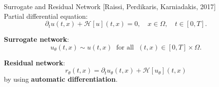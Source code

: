 \documentclass[9pt]{beamer}
\begin{document}
\begin{frame}{Surrogate and Residual Network}
    \vspace{-1\baselineskip}\hfill{\tiny{[Raissi, Perdikaris, Karniadakis, 2017]}} \\
    Partial differential equation: \\
    \begin{equation*}
        \partial_t u\left(t,x\right) + \mathcal{H} \left[ u \right] \left(t, x\right) = 0, \quad x \in \Omega, \quad t \in \left[ 0, T \right].
    \end{equation*}

    \vspace{3mm}

    \textbf{Surrogate network}: \\
    \begin{equation*}
        u_\theta \left(t, x \right) \sim u\left(t,x\right) \; \text{ for all } \; \left(t, x \right) \in \left[ 0, T \right] \times \Omega.
    \end{equation*}
    
    \vspace{3mm}

    \textbf{Residual network}: \\
    \begin{equation*}
        r_{\theta} \left(t,x\right) = \partial_t u_{\theta} \left(t,x\right) + \mathcal{H} \left[ u_{\theta} \right] \left(t, x\right)
    \end{equation*}
    by using \textbf{automatic differentiation}.

\end{frame}
\end{document}
